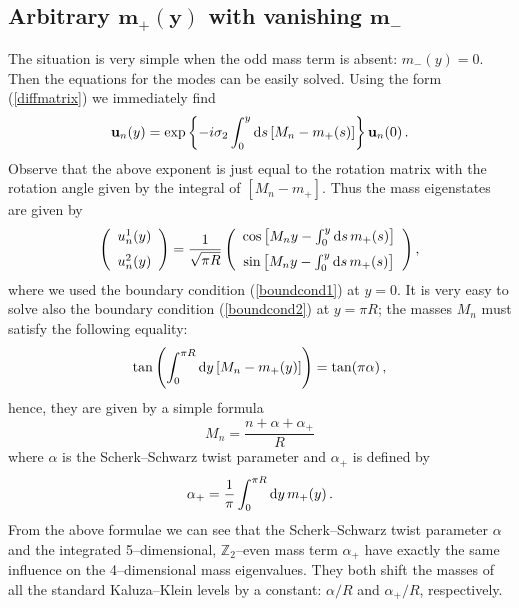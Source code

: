\documentclass[a4paper,12pt]{article}
\def\si{\sigma}
\def\al{\alpha}
\def\d{{\rm d}}
\def\bu{{\bf u}}
\def\ZZ{\mathbb Z}
\begin{document}
\subsection{Arbitrary $\boldsymbol{m_+(y)}$ with vanishing
$\boldsymbol{m_-}$} 
\label{mplus}

The situation is very simple when the odd mass term is absent:
$m_-(y)=0$. Then the equations for the modes can be easily
solved. Using the form (\ref{diffmatrix}) we immediately find
\begin{equation}
\bu_n(y)
=
\exp\left\{-i\si_2\int_0^y\d s\,[M_n-m_+(s)]\right\}
\bu_n(0)
\,.
\label{uvector}
\end{equation}
Observe that the above exponent is just equal to the rotation matrix
with the rotation angle given by the integral of $[M_n-m_+]$. 
Thus the mass eigenstates are given by
\begin{equation}
\left(
\begin{array}{c}
u_n^1(y)
\\[6pt] 
u_n^2(y)
\end{array}
\right)
=
\frac{1}{\sqrt{\pi R}}
\left(
\begin{array}{c}
\cos\left[M_ny-\int_0^y\d s\,m_+(s)\right]
\\[6pt]
\sin\left[M_ny-\int_0^y\d s\,m_+(s)\right]
\end{array}
\right)
,
\label{un}
\end{equation}
where we used the boundary condition (\ref{boundcond1}) at $y=0$.
It is very easy to solve also the boundary condition
(\ref{boundcond2}) at $y=\pi R$; the masses $M_n$ must satisfy
the following equality:
\begin{equation}
\tan\left(\int_0^{\pi R}\d y\,[M_n-m_+(y)]\right)
=\tan(\pi\al)
\,,
\end{equation}
hence, they are given by a simple formula
\begin{equation}
M_n=\frac{n+\al+\al_+}{R}
\label{Mn}
\end{equation}
where $\al$ is the Scherk--Schwarz twist parameter and $\al_+$ is
defined by
\begin{equation}
\al_+=\frac{1}{\pi}\int_0^{\pi R}\d y\,m_+(y)
\,.
\label{alphaplus}
\end{equation}
From the above formulae we can see that the Scherk--Schwarz twist
parameter $\al$ and the integrated 5--dimensional, $\ZZ_2$--even mass
term $\al_+$ 
have exactly the same influence on the 4--dimensional mass
eigenvalues. They both shift the masses of all the standard
Kaluza--Klein levels by a constant: $\al/R$ and $\al_+/R$,
respectively.  
\end{document}
